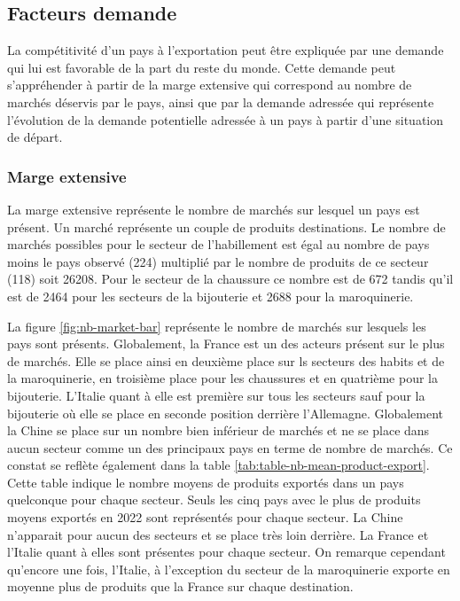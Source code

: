 \documentclass[french,10pt,a4paper]{article}
\begin{document}
\subsection{Facteurs demande}

La compétitivité d'un pays à l'exportation peut être expliquée par une demande qui lui est favorable de la part du reste du monde. Cette demande peut s'appréhender à partir de la marge extensive qui correspond au nombre de marchés déservis par le pays, ainsi que par la demande adressée qui représente l'évolution de la demande potentielle adressée à un pays à partir d'une situation de départ.

\subsubsection{Marge extensive}


La marge extensive représente le nombre de marchés sur lesquel un pays est présent. Un marché représente un couple de produits destinations. Le nombre de marchés possibles pour le secteur de l'habillement est égal au nombre de pays moins le pays observé (224) multiplié par le nombre de produits de ce secteur (118) soit 26208. Pour le secteur de la chaussure ce nombre est de 672 tandis qu'il est de 2464 pour les secteurs de la bijouterie et 2688 pour la maroquinerie.

La figure \ref{fig:nb-market-bar} représente le nombre de marchés sur lesquels les pays sont présents. Globalement, la France est un des acteurs présent sur le plus de marchés. Elle se place ainsi en deuxième place sur ls secteurs des habits et de la maroquinerie, en troisième place pour les chaussures et en quatrième pour la bijouterie. L'Italie quant à elle est première sur tous les secteurs sauf pour la bijouterie où elle se place en seconde position derrière l'Allemagne. Globalement la Chine se place sur un nombre bien inférieur de marchés et ne se place dans aucun secteur comme un des principaux pays en terme de nombre de marchés. Ce constat se reflète également dans la table \ref{tab:table-nb-mean-product-export}. Cette table indique le nombre moyens de produits exportés dans un pays quelconque pour chaque secteur. Seuls les cinq pays avec le plus de produits moyens exportés en 2022 sont représentés pour chaque secteur. La Chine n'apparait pour aucun des secteurs et se place très loin derrière. La France et l'Italie quant à elles sont présentes pour chaque secteur. On remarque cependant qu'encore une fois, l'Italie, à l'exception du secteur de la maroquinerie exporte en moyenne plus de produits que la France sur chaque destination.
\end{document}
